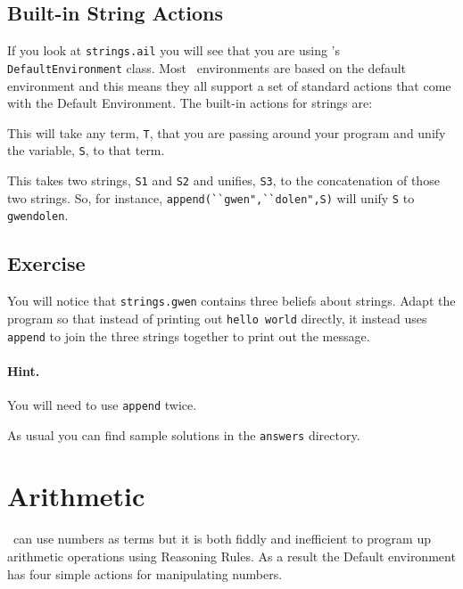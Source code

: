 \subsection{Built-in String Actions}
If you look at \texttt{strings.ail} you will see that you are using \ail's \texttt{DefaultEnvironment} class.  Most \gwendolen\ environments are based on the default environment and this means they all support a set of standard actions that come with the Default Environment.  The built-in actions for strings are:
\begin{description}
\item[toString(T, S)] This will take any term, \lstinline{T}, that you are passing around your program and unify the variable, \lstinline{S}, to that term.
\item[append(S1, S2, S3)]  This takes two strings, \lstinline{S1} and \lstinline{S2} and unifies, \lstinline{S3}, to the concatenation of those two strings.  So, for instance, \lstinline{append(``gwen",``dolen",S)} will unify \lstinline{S} to \lstinline{gwendolen}.
\end{description}

\subsection{Exercise}
You will notice that \texttt{strings.gwen} contains three beliefs about strings.  Adapt the program so that instead of printing out \texttt{hello world} directly, it instead uses \lstinline{append} to join the three strings together to print out the message.

\paragraph{Hint.} You will need to use \lstinline{append} twice.

As usual you can find sample solutions in the \texttt{answers} directory.

\section{Arithmetic}

\gwendolen\ can use numbers as terms but it is both fiddly and inefficient to program up arithmetic operations using Reasoning Rules.  As a result the Default environment has four simple actions for manipulating numbers.

